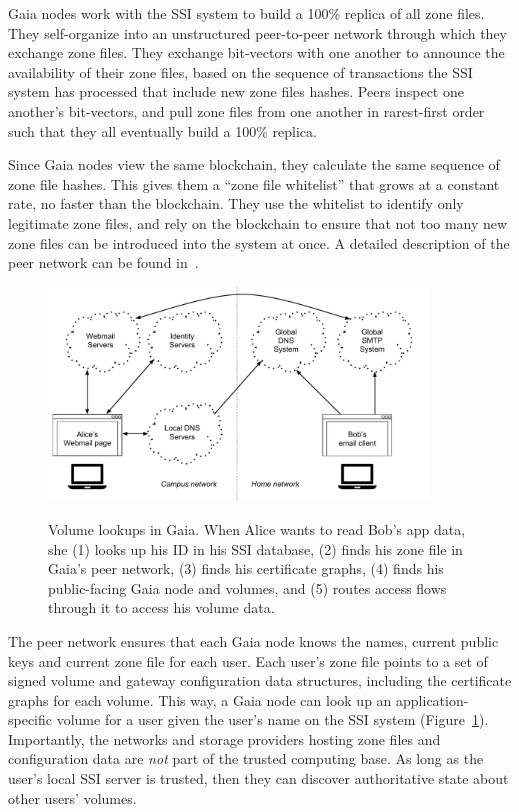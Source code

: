 Gaia nodes work with the SSI system to build a 100\% replica of all zone files.
They self-organize into an unstructured
peer-to-peer network through which they exchange zone files.  They exchange
bit-vectors with one another to announce the availability of their zone files,
based on the sequence of transactions the SSI system has processed that include
new zone files hashes.  Peers inspect one another's bit-vectors, and pull
zone files from one another in rarest-first order such that they all eventually
build a 100\% replica.

Since Gaia nodes view the same blockchain, they calculate the same sequence of zone
file hashes.  This gives them a ``zone file whitelist'' that grows at a constant
rate, no faster than the blockchain.  They use the whitelist to identify only
legitimate zone files, and rely on the blockchain to ensure that not too many
new zone files can be introduced into the system at once.  A detailed
description of the peer network can be found in~\cite{ali2017}.

\begin{figure}[h]
   \caption{Volume lookups in Gaia.  When Alice wants to read Bob's app data, she
   (1) looks up his ID in his SSI database, (2) finds his zone file in
   Gaia's peer network, (3) finds his certificate graphs, (4) finds his
   public-facing Gaia node and volumes, and (5) routes access flows through it
   to access his volume data.}
   \centering
   \includegraphics[width=0.9\textwidth,page=18]{figures/dissertation-figures}
   \label{fig:chap3-gaia-volume-lookups}
\end{figure}

The peer network ensures that each Gaia node knows the names, current public
keys and current zone file for each user.  Each user's
zone file points to a set of signed volume and gateway configuration data
structures, including the certificate graphs for each volume. 
This way, a Gaia node can
look up an application-specific volume for a user given the user's name on the
SSI system (Figure~\ref{fig:chap3-gaia-volume-lookups}).  Importantly, the networks and storage
providers hosting zone files and configuration data are \emph{not} part
of the trusted computing base.  As long as the user's local SSI server is
trusted, then they can discover authoritative state about other users' volumes.

